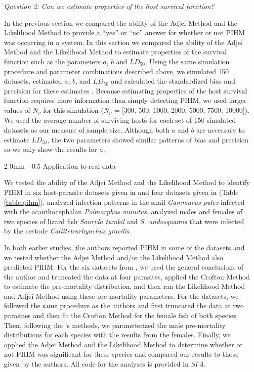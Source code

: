 \documentclass[12pt, a4paper]{article}
\makeatletter
\renewcommand{\subsection}{\@startsection
{subsection}%
{2}%
{0mm}%
{-\baselineskip}%
{0.5\baselineskip}%
{\normalfont\bf}} %
\makeatother
\begin{document}
\noindent
\emph{Question 2: Can we estimate properties of the host survival function?}

In the previous section we compared the ability of the Adjei Method and the Likelihood Method to provide a ``yes'' or ``no'' answer for whether or not PIHM was occurring in a system. In this section we compared the ability of the Adjei Method and the Likelihood Method to estimate properties of the survival function such as the parameters $a$, $b$ and $LD_{50}$.  Using the same simulation procedure and parameter combinations described above, we simulated 150 datasets, estimated $a$, $b$, and $LD_{50}$ and calculated the standardized bias and
precision for these estimates \citep{Walther2005}.  Because estimating properties of the host survival function requires more information than simply detecting PIHM, we used larger values of $N_p$ for this simulation ($N_p$ = [300, 500, 1000, 2000, 5000, 7500,
10000]).  We used the average number of surviving hosts for each set of 150 simulated datasets as our measure of sample size.  Although both $a$ and $b$ are necessary to estimate $LD_{50}$, the two parameters showed similar patterns of bias and precision so we only show the results for $a$.

\subsection{Application to real data}

We tested the ability of the Adjei Method and the Likelihood Method to identify
PIHM in six host-parasite datasets given in \cite{Crofton1971a} and four datasets
given in \cite{Adjei1986} (Table \ref{table:pihm}). \citeauthor{Crofton1971a} analyzed infection patterns in the snail \emph{Gammarus pulex} infected with the
acanthocephalan \emph{Polmorphus minutus}. \citeauthor{Adjei1986} analyzed males and females of two species of lizard fish \emph{Saurida tumbil} and
\emph{S. undosquamis} that were infected by the cestode
\emph{Callitetrarhynchus gracilis}.

In both earlier studies, the authors reported PIHM in some of the datasets and we tested whether the Adjei
Method and/or the Likelihood Method also predicted PIHM. For the six datasets from
\cite{Crofton1971a}, we used the general conclusions of the author and truncated the data at four parasites, applied the Crofton
Method to estimate the pre-mortality distribution, and then ran the Likelihood
Method and Adjei Method using these pre-mortality parameters.  For the
\cite{Adjei1986} datasets, we followed the same procedure as the authors and
first truncated the data at two parasites and then fit the Crofton Method for the
female fish of both species.  Then, following the \citeauthor{Adjei1986}'s methods, we parameterized the male pre-mortality
distributions for each species with the results from the females.  Finally, we
applied the Adjei Method and the Likelihood Method to determine whether or not
PIHM was significant for these species and compared our results to those given by the authors.  All code for the analyses is provided in \emph{SI} 4.
\end{document}
